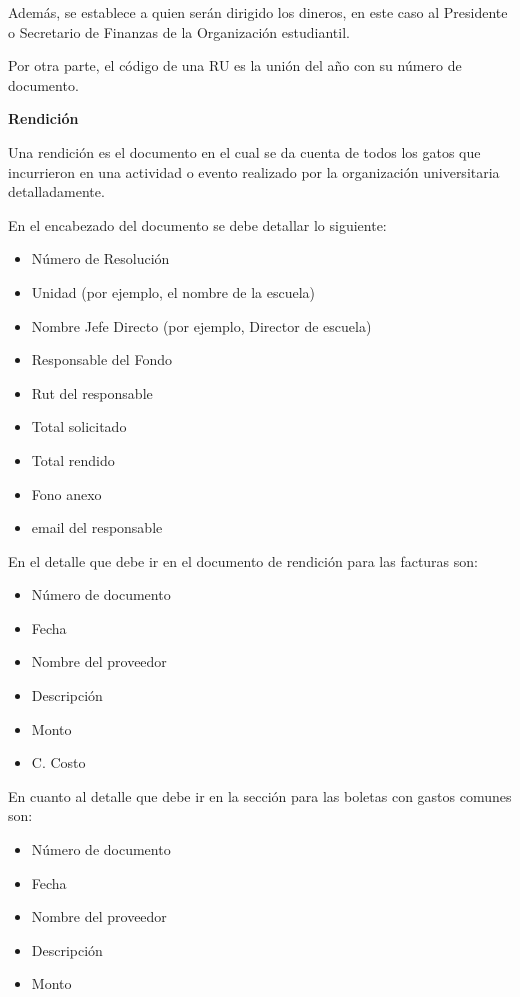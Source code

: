   Además, se establece a quien serán dirigido los dineros, en este caso al Presidente o Secretario de Finanzas de la Organización estudiantil.

  Por otra parte, el código de una RU es la unión del año con su número de documento. 

  \textbf{Rendición}

  Una rendición es el documento en el cual se da cuenta de todos los gatos que incurrieron en una actividad o evento realizado por la organización universitaria detalladamente. 
  
  En el encabezado del documento se debe detallar lo siguiente:
  
  \begin{itemize}
    \item Número de Resolución
    \item Unidad (por ejemplo, el nombre de la escuela)
    \item Nombre Jefe Directo (por ejemplo, Director de escuela)
    \item Responsable del Fondo
    \item Rut del responsable
    \item Total solicitado
    \item Total rendido
    \item Fono anexo
    \item email del responsable
  \end{itemize}
  
  En el detalle que debe ir en el documento de rendición para las facturas son:
  
  \begin{itemize}
    \item Número de documento
    \item Fecha
    \item Nombre del proveedor
    \item Descripción
    \item Monto
    \item C. Costo
  \end{itemize}
  
  En cuanto al detalle que debe ir en la sección para las boletas con gastos comunes son:
  
  \begin{itemize}
    \item Número de documento
    \item Fecha
    \item Nombre del proveedor
    \item Descripción
    \item Monto
  \end{itemize}
  
